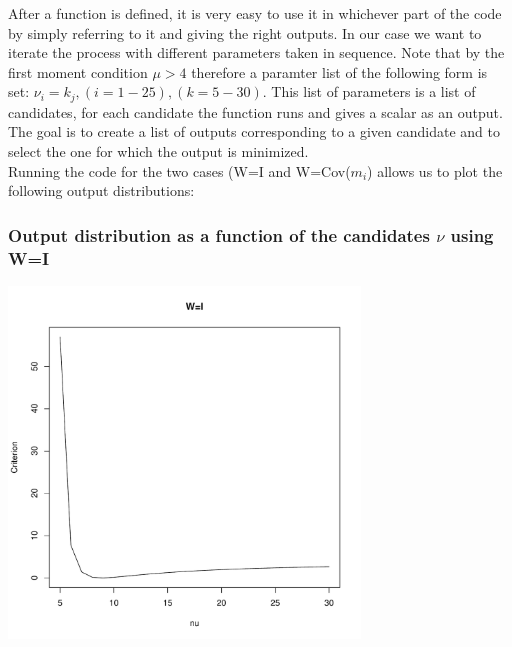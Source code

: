 After a function is defined, it is very easy to use it in whichever part of the code by simply referring to it and giving the right outputs. In our case we want to iterate the process with different parameters taken in sequence. Note that by the first moment condition $\mu>4$ therefore a paramter list of the following form is set: $\nu_i=k_j, (i=1-25), (k=5-30)$. This list of parameters is a list of candidates, for each candidate the function runs and gives a scalar as an output. The goal is to create a list of outputs corresponding to a given candidate and to select the one for which the output is minimized.\\
Running the code for the two cases (W=I and W=Cov($m_i$) allows us to plot the following output distributions:

\newpage

\subsubsection{Output distribution as a function of the candidates $\nu$ using W=I}
\begin{center}
    \includegraphics[width=0.7\textwidth]{Graph1_1.pdf}    
\end{center}
